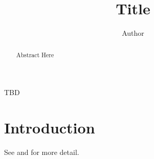 \documentclass{iuthesis}
\title{Title}
\author{Author}
\begin{document}
\frontmatter

\begin{acknowledgements}
TBD
\end{acknowledgements}

\begin{abstract}
Abstract Here
\end{abstract}

\maketitle
\signaturepage
\copyrightpage
\makededication
\makeabstract
\tableofcontents

\mainmatter

\chapter{Introduction\label{ch:intro}} %

See \cite{small} and \cite{big} for more detail.




\printindex
\end{document}
